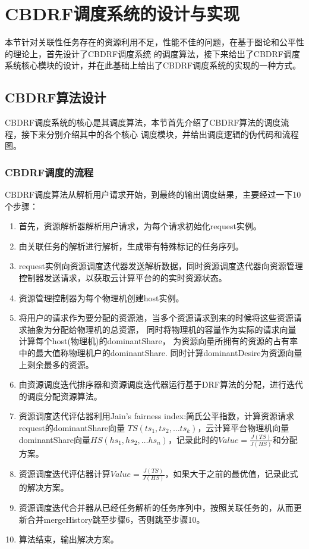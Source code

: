 \chapter{CBDRF调度系统的设计与实现}
\label{cha:frontmatter}
本节针对关联性任务存在的资源利用不足，性能不佳的问题，在基于图论和公平性的理论上，首先设计了CBDRF调度系统
的调度算法，接下来给出了CBDRF调度系统核心模块的设计，并在此基础上给出了CBDRF调度系统的实现的一种方式。

\section{CBDRF算法设计}
CBDRF调度系统的核心是其调度算法，本节首先介绍了CBDRF算法的调度流程，接下来分别介绍其中的各个核心
调度模块，并给出调度逻辑的伪代码和流程图。
\subsection{CBDRF调度的流程}
CBDRF调度算法从解析用户请求开始，到最终的输出调度结果，主要经过一下10个步骤：
\begin{enumerate}
\item 首先，资源解析器解析用户请求，为每个请求初始化request实例。
\item 由关联任务的解析进行解析，生成带有特殊标记的任务序列。
\item request实例向资源调度迭代器发送解析数据，同时资源调度迭代器向资源管理控制器发送请求，以获取云计算平台的的实时资源状态。
\item 资源管理控制器为每个物理机创建host实例。
\item 将用户的请求作为要分配的资源池，当多个资源请求到来的时候将这些资源请求抽象为分配给物理机的总资源，
同时将物理机的容量作为实际的请求向量计算每个host(物理机)的dominantShare，
为资源向量所拥有的资源的占有率中的最大值称物理机户的dominantShare.
同时计算dominantDesire为资源向量上剩余最多的资源。
\item 由资源调度迭代排序器和资源调度迭代器运行基于DRF算法的分配，进行迭代的调度分配资源算法。
\item 资源调度迭代评估器利用Jain’s fairness index:简氏公平指数，计算资源请求request的dominantShare向量
$TS\left({ts}_{1},{ts}_{2},…{ts}_{k}\right )$，云计算平台物理机向量dominantShare向量$HS\left({hs}_{1},{hs}_{2},…{hs}_{n}\right )$，记录此时的$Value = \frac{J(TS)}{J(HS)}$和分配方案。
\item 资源调度迭代评估器计算$Value = \frac{J(TS)}{J(HS)}$，如果大于之前的最优值，记录此式的解决方案。
\item 资源调度迭代合并器从已经任务解析的任务序列中，按照关联任务的，从而更新合并mergeHistory跳至步骤6，否则跳至步骤10。
\item 算法结束，输出解决方案。
\end{enumerate}

